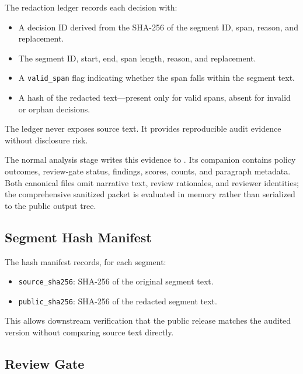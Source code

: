 \documentclass[
]{article}
\providecommand{\tightlist}{%
  \setlength{\itemsep}{0pt}\setlength{\parskip}{0pt}}
\begin{document}
The redaction ledger records each decision with:

\begin{itemize}
\tightlist
\item
  A decision ID derived from the SHA-256 of the segment ID, span,
  reason, and replacement.
\item
  The segment ID, start, end, span length, reason, and replacement.
\item
  A \texttt{valid\_span} flag indicating whether the span falls within
  the segment text.
\item
  A  hash of the redacted text---present
  only for valid spans, absent for invalid or orphan decisions.
\end{itemize}

The ledger never exposes source text. It provides reproducible audit
evidence without disclosure risk.

The normal analysis stage writes this evidence to
. Its companion
 contains policy outcomes,
review-gate status, findings, scores, counts, and paragraph metadata.
Both canonical files omit narrative text, review rationales, and
reviewer identities; the comprehensive sanitized packet is evaluated in
memory rather than serialized to the public output tree.

\subsection{Segment Hash Manifest}\label{segment-hash-manifest}

The hash manifest records, for each segment:

\begin{itemize}
\tightlist
\item
  \texttt{source\_sha256}: SHA-256 of the original segment text.
\item
  \texttt{public\_sha256}: SHA-256 of the redacted segment text.
\end{itemize}

This allows downstream verification that the public release matches the
audited version without comparing source text directly.

\subsection{Review Gate}\label{review-gate}
\end{document}

